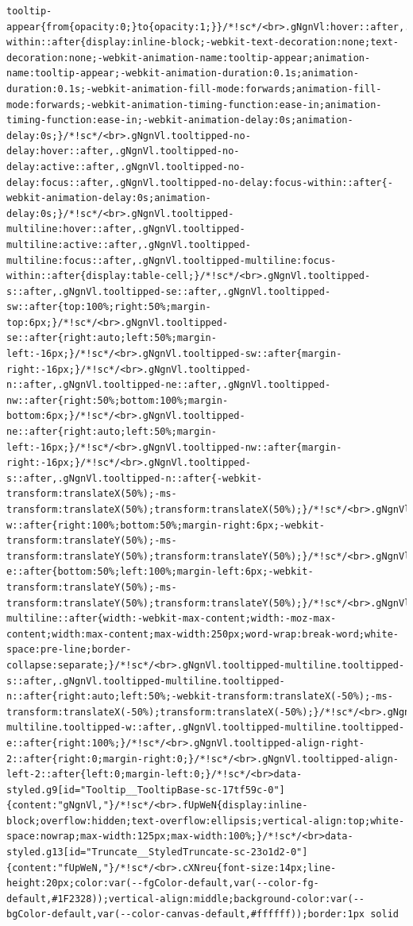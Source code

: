 \documentclass[
  letterpaper,
]{book}
\begin{document}
\begin{verbatim}
tooltip-appear{from{opacity:0;}to{opacity:1;}}/*!sc*/<br>.gNgnVl:hover::after,.gNgnVl:active::after,.gNgnVl:focus::after,.gNgnVl:focus-within::after{display:inline-block;-webkit-text-decoration:none;text-decoration:none;-webkit-animation-name:tooltip-appear;animation-name:tooltip-appear;-webkit-animation-duration:0.1s;animation-duration:0.1s;-webkit-animation-fill-mode:forwards;animation-fill-mode:forwards;-webkit-animation-timing-function:ease-in;animation-timing-function:ease-in;-webkit-animation-delay:0s;animation-delay:0s;}/*!sc*/<br>.gNgnVl.tooltipped-no-delay:hover::after,.gNgnVl.tooltipped-no-delay:active::after,.gNgnVl.tooltipped-no-delay:focus::after,.gNgnVl.tooltipped-no-delay:focus-within::after{-webkit-animation-delay:0s;animation-delay:0s;}/*!sc*/<br>.gNgnVl.tooltipped-multiline:hover::after,.gNgnVl.tooltipped-multiline:active::after,.gNgnVl.tooltipped-multiline:focus::after,.gNgnVl.tooltipped-multiline:focus-within::after{display:table-cell;}/*!sc*/<br>.gNgnVl.tooltipped-s::after,.gNgnVl.tooltipped-se::after,.gNgnVl.tooltipped-sw::after{top:100%;right:50%;margin-top:6px;}/*!sc*/<br>.gNgnVl.tooltipped-se::after{right:auto;left:50%;margin-left:-16px;}/*!sc*/<br>.gNgnVl.tooltipped-sw::after{margin-right:-16px;}/*!sc*/<br>.gNgnVl.tooltipped-n::after,.gNgnVl.tooltipped-ne::after,.gNgnVl.tooltipped-nw::after{right:50%;bottom:100%;margin-bottom:6px;}/*!sc*/<br>.gNgnVl.tooltipped-ne::after{right:auto;left:50%;margin-left:-16px;}/*!sc*/<br>.gNgnVl.tooltipped-nw::after{margin-right:-16px;}/*!sc*/<br>.gNgnVl.tooltipped-s::after,.gNgnVl.tooltipped-n::after{-webkit-transform:translateX(50%);-ms-transform:translateX(50%);transform:translateX(50%);}/*!sc*/<br>.gNgnVl.tooltipped-w::after{right:100%;bottom:50%;margin-right:6px;-webkit-transform:translateY(50%);-ms-transform:translateY(50%);transform:translateY(50%);}/*!sc*/<br>.gNgnVl.tooltipped-e::after{bottom:50%;left:100%;margin-left:6px;-webkit-transform:translateY(50%);-ms-transform:translateY(50%);transform:translateY(50%);}/*!sc*/<br>.gNgnVl.tooltipped-multiline::after{width:-webkit-max-content;width:-moz-max-content;width:max-content;max-width:250px;word-wrap:break-word;white-space:pre-line;border-collapse:separate;}/*!sc*/<br>.gNgnVl.tooltipped-multiline.tooltipped-s::after,.gNgnVl.tooltipped-multiline.tooltipped-n::after{right:auto;left:50%;-webkit-transform:translateX(-50%);-ms-transform:translateX(-50%);transform:translateX(-50%);}/*!sc*/<br>.gNgnVl.tooltipped-multiline.tooltipped-w::after,.gNgnVl.tooltipped-multiline.tooltipped-e::after{right:100%;}/*!sc*/<br>.gNgnVl.tooltipped-align-right-2::after{right:0;margin-right:0;}/*!sc*/<br>.gNgnVl.tooltipped-align-left-2::after{left:0;margin-left:0;}/*!sc*/<br>data-styled.g9[id="Tooltip__TooltipBase-sc-17tf59c-0"]{content:"gNgnVl,"}/*!sc*/<br>.fUpWeN{display:inline-block;overflow:hidden;text-overflow:ellipsis;vertical-align:top;white-space:nowrap;max-width:125px;max-width:100%;}/*!sc*/<br>data-styled.g13[id="Truncate__StyledTruncate-sc-23o1d2-0"]{content:"fUpWeN,"}/*!sc*/<br>.cXNreu{font-size:14px;line-height:20px;color:var(--fgColor-default,var(--color-fg-default,#1F2328));vertical-align:middle;background-color:var(--bgColor-default,var(--color-canvas-default,#ffffff));border:1px solid 
\end{verbatim}
\end{document}

